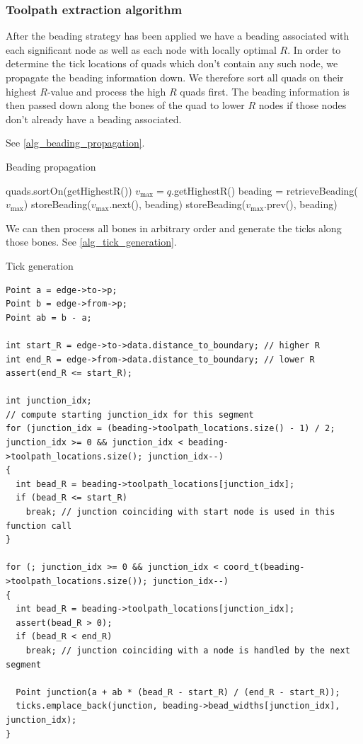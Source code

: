 \subsubsection{Toolpath extraction algorithm}
After the beading strategy has been applied we have a beading associated with each significant node as well as each node with locally optimal $R$.
In order to determine the tick locations of quads which don't contain any such node, we propagate the beading information down.
We therefore sort all quads on their highest $R$-value and process the high $R$ quads first.
The beading information is then passed down along the bones of the quad to lower $R$ nodes if those nodes don't already have a beading associated.

See \cref{alg_beading_propagation}.

\begin{algorithm}
\caption{Beading propagation}
\label{alg_beading_propagation}
\begin{algorithmic}
\State quads.sortOn(getHighestR())
	\State $v_\text{max} = q$.getHighestR()
	\State beading = retrieveBeading($v_\text{max}$)
		\State storeBeading($v_\text{max}$.next(), beading)
	\EndIf
		\State storeBeading($v_\text{max}$.prev(), beading)
	\EndIf
\EndFor
\end{algorithmic}
\end{algorithm}


We can then process all bones in arbitrary order and generate the ticks along those bones.
See \cref{alg_tick_generation}.

\begin{algorithm}
\caption{Tick generation}
\label{alg_tick_generation}
\lstset{language=C++}
\begin{lstlisting}[frame=single]
Point a = edge->to->p;
Point b = edge->from->p;
Point ab = b - a;

int start_R = edge->to->data.distance_to_boundary; // higher R
int end_R = edge->from->data.distance_to_boundary; // lower R
assert(end_R <= start_R);

int junction_idx;
// compute starting junction_idx for this segment
for (junction_idx = (beading->toolpath_locations.size() - 1) / 2; junction_idx >= 0 && junction_idx < beading->toolpath_locations.size(); junction_idx--)
{
  int bead_R = beading->toolpath_locations[junction_idx];
  if (bead_R <= start_R)
    break; // junction coinciding with start node is used in this function call
}

for (; junction_idx >= 0 && junction_idx < coord_t(beading->toolpath_locations.size()); junction_idx--)
{
  int bead_R = beading->toolpath_locations[junction_idx];
  assert(bead_R > 0);
  if (bead_R < end_R)
    break; // junction coinciding with a node is handled by the next segment
  
  Point junction(a + ab * (bead_R - start_R) / (end_R - start_R));
  ticks.emplace_back(junction, beading->bead_widths[junction_idx], junction_idx);
}
\end{lstlisting}
\end{algorithm}


